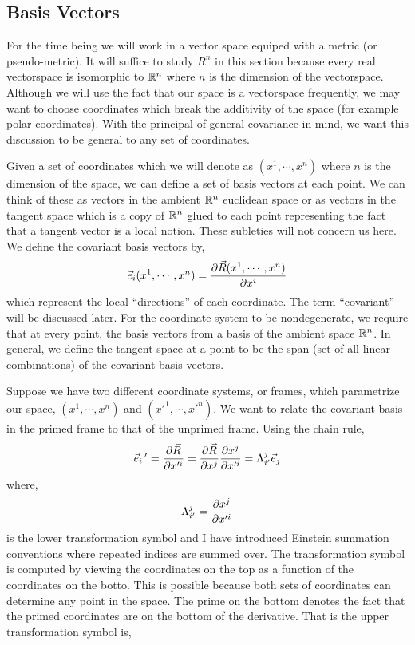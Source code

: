 \documentclass[11pt, a4paper]{article}
\begin{document}
\subsection{Basis Vectors}

For the time being we will work in a vector space equiped with a metric (or pseudo-metric). It will suffice to study $R^n$ in this section because every real vectorspace is isomorphic to $\mathbb{R}^n$ where $n$ is the dimension of the vectorspace. Although we will use the fact that our space is a vectorspace frequently, we may want to choose coordinates which break the additivity of the space (for example polar coordinates). With the principal of general covariance in mind, we want this discussion to be general to any set of coordinates. 
\par
Given a set of coordinates which we will denote as $(x^1, \cdots, x^n)$ where $n$ is the dimension of the space, we can define a set of basis vectors at each point. We can think of these as vectors in the ambient $\mathbb{R}^n$ euclidean space or as vectors in the tangent space which is a copy of $\mathbb{R}^n$ glued to each point representing the fact that a tangent vector is a local notion. These subleties will not concern us here. We define the covariant basis vectors by,
\[ \vec{e}_i(x^1, \cdots, x^n) = \frac{\partial{\vec{R}(x^1, \cdots, x^n)}}{\partial{x^i}} \]
which represent the local ``directions'' of each coordinate. The term ``covariant'' will be discussed later. For the coordinate system to be nondegenerate, we require that at every point, the basis vectors from a basis of the ambient space $\mathbb{R}^n$. In general, we define the tangent space at a point to be the span (set of all linear combinations) of the covariant basis vectors.  
\par
Suppose we have two different coordinate systems, or frames, which parametrize our space, $(x^1, \cdots, x^n)$ and $(x'^1, \cdots, x'^n)$. We want to relate the covariant basis in the primed frame to that of the unprimed frame. Using the chain rule,
\[ \vec{e}_i{\, '} = \frac{\partial{\vec{R}}}{\partial{x'^i}} =  \frac{\partial{\vec{R}}}{\partial{x^j}} \frac{\partial{x^j}}{\partial{x'^i}} = \Lambda^j_{i'} \vec{e}_j \] 
where, 
\[\Lambda^j_{i'} = \frac{\partial{x^j}}{\partial{x'^i}}\]
is the lower transformation symbol and I have introduced Einstein summation conventions where repeated indices are summed over. The transformation symbol is computed by viewing the coordinates on the top as a function of the coordinates on the botto. This is possible because both sets of coordinates can determine any point in the space. The prime on the bottom denotes the fact that the primed coordinates are on the bottom of the derivative. That is the upper transformation symbol is,
\end{document}

